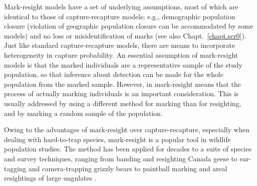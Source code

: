 Mark-resight models have a set of underlying assumptions, most of
which are identical
to those of capture-recapture models;
e.g., demographic population closure (violation of geographic
population closure can be accommodated by some models) and no loss or
misidentification of marks (see also Chapt.~\ref{chapt.scr0}).
Just like standard capture-recapture
models, there are means to incorporate heterogeneity in capture
probability. An essential assumption of mark-resight
models is that the marked individuals are
a representative sample of the study population, so that inference
about detection can be made for the whole population from
the marked sample. However, in mark-resight means that the process
of actually marking individuals is an important consideration.
This is usually addressed by using a
different method for marking than for resighting, and by marking a
random sample of the population.

Owing to the advantages of mark-resight over capture-recapture,
especially when dealing with hard-to-trap species, mark-resight is a
popular tool in wildlife population studies. The method has been
applied for decades
to a suite of species and survey techniques,
ranging from banding and resighting Canada geese
\citep{hestbeck_malecki:1989} to ear-tagging and camera-trapping
grizzly bears \citep{mace_etal:1994} to paintball marking and areal
resightings of large ungulates \citep{skalski_etal:2005jwm}.


